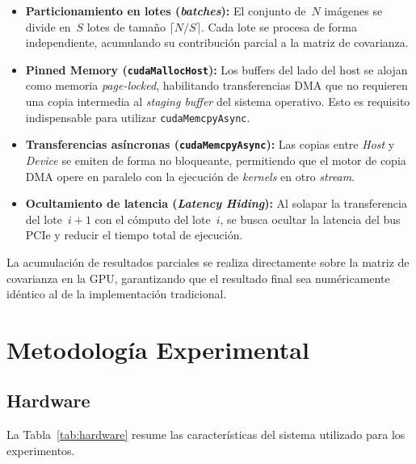 \documentclass[12pt, a4paper]{article}
\begin{document}
\begin{itemize}
    \item \textbf{Particionamiento en lotes (\textit{batches}):} El conjunto
          de~$N$ imágenes se divide en~$S$ lotes de tamaño
          $\lceil N/S \rceil$. Cada lote se procesa de forma independiente,
          acumulando su contribución parcial a la matriz de covarianza.

    \item \textbf{Pinned Memory (\texttt{cudaMallocHost}):} Los buffers del
          lado del host se alojan como memoria \textit{page-locked}, habilitando
          transferencias DMA que no requieren una copia intermedia al
          \textit{staging buffer} del sistema operativo. Esto es requisito
          indispensable para utilizar \texttt{cudaMemcpyAsync}.

    \item \textbf{Transferencias asíncronas (\texttt{cudaMemcpyAsync}):}
          Las copias entre \textit{Host} y \textit{Device} se emiten de forma
          no bloqueante, permitiendo que el motor de copia DMA opere en
          paralelo con la ejecución de \textit{kernels} en otro \textit{stream}.

    \item \textbf{Ocultamiento de latencia (\textit{Latency Hiding}):}
          Al solapar la transferencia del lote~$i+1$ con el cómputo del
          lote~$i$, se busca ocultar la latencia del bus PCIe y reducir el
          tiempo total de ejecución.
\end{itemize}

La acumulación de resultados parciales se realiza directamente sobre la matriz
de covarianza en la GPU, garantizando que el resultado final sea
numéricamente idéntico al de la implementación tradicional.

\section{Metodología Experimental}

\subsection{Hardware}

La Tabla~\ref{tab:hardware} resume las características del sistema utilizado
para los experimentos.
\end{document}
